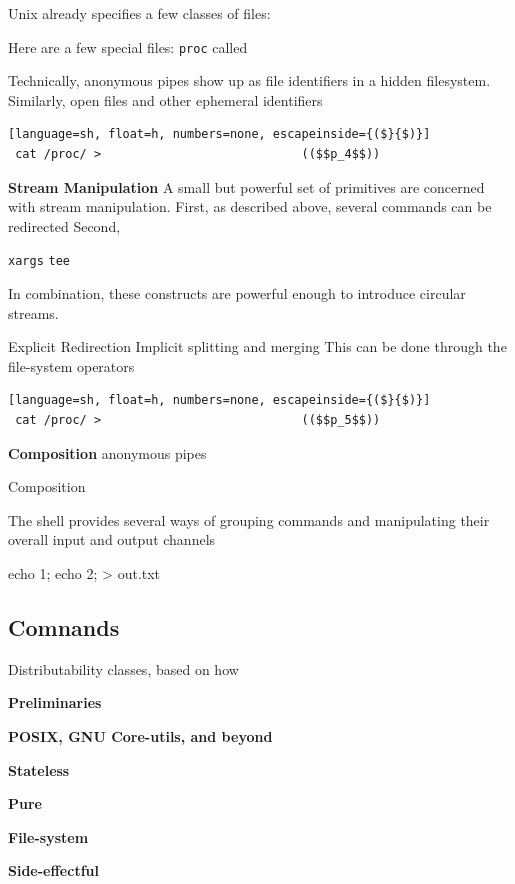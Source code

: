 \documentclass[sigplan,10pt,review,anonymous]{acmart}
\newcommand{\heading}[1]{\vspace{4pt}\noindent\textbf{#1}\enspace}
\newcommand{\ttt}[1]{\texttt{\small #1}}
\begin{document}
Unix already specifies a few classes of files:

Here are a few special files:
  \ttt{proc} called 

Technically, anonymous pipes show up as file identifiers in a hidden filesystem.
Similarly, open files and other ephemeral identifiers 


\begin{lstlisting}[language=sh, float=h, numbers=none, escapeinside={($}{$)}]
 cat /proc/ >                            (($$p_4$$))
\end{lstlisting}

\heading{Stream Manipulation}
A small but powerful set of primitives are concerned with stream manipulation.
First, as described above, several commands can be redirected
Second, 

\ttt{xargs}
\ttt{tee}

In combination, these constructs are powerful enough to introduce circular streams. %

Explicit Redirection
Implicit splitting and merging 
This can be done through the file-system operators 

\begin{lstlisting}[language=sh, float=h, numbers=none, escapeinside={($}{$)}]
 cat /proc/ >                            (($$p_5$$))
\end{lstlisting}

\heading{Composition}
anonymous pipes

Composition

The shell provides several ways of grouping commands and manipulating their
overall input and output channels 

{ echo 1; echo 2; } > out.txt

\subsection{Comnands}
\label{bg:cmd}


Distributability classes, based on how 

\heading{Preliminaries}

\heading{POSIX, GNU Core-utils, and beyond}

\heading{Stateless}

\heading{Pure}

\heading{File-system}

\heading{Side-effectful}
\end{document}
